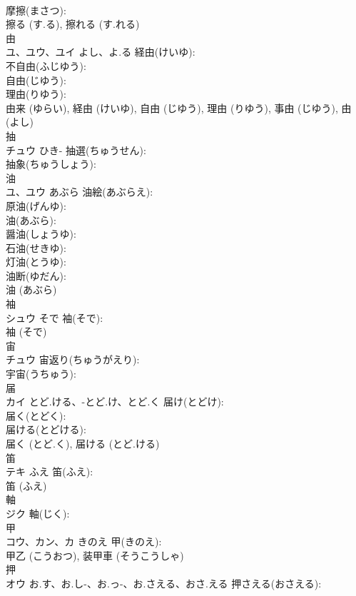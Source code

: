 \documentclass[8pt]{extreport}
\begin{document}
\begin{CJK}{UTF8}{min}
\\	摩擦(まさつ): 
\\	擦る (す.る), 擦れる (す.れる)
\\	由			
\\	ユ、ユウ、ユイ	よし、よ.る	経由(けいゆ): 
\\	不自由(ふじゆう): 
\\	自由(じゆう): 
\\	理由(りゆう): 
\\	由来 (ゆらい), 経由 (けいゆ), 自由 (じゆう), 理由 (りゆう), 事由 (じゆう), 由 (よし)
\\	抽			
\\	チュウ	ひき-	抽選(ちゅうせん): 
\\	抽象(ちゅうしょう): 
\\	油			
\\	ユ、ユウ	あぶら	油絵(あぶらえ): 
\\	原油(げんゆ): 
\\	油(あぶら): 
\\	醤油(しょうゆ): 
\\	石油(せきゆ): 
\\	灯油(とうゆ): 
\\	油断(ゆだん): 
\\	油 (あぶら)
\\	袖			
\\	シュウ	そで	袖(そで): 
\\	袖 (そで)
\\	宙			
\\	チュウ		宙返り(ちゅうがえり): 
\\	宇宙(うちゅう): 
\\	届			
\\	カイ	とど.ける、-とど.け、とど.く	届け(とどけ): 
\\	届く(とどく): 
\\	届ける(とどける): 
\\	届く (とど.く), 届ける (とど.ける)
\\	笛			
\\	テキ	ふえ	笛(ふえ): 
\\	笛 (ふえ)
\\	軸			
\\	ジク		軸(じく): 
\\	甲			
\\	コウ、カン、カ	きのえ	甲(きのえ): 
\\	甲乙 (こうおつ), 装甲車 (そうこうしゃ)
\\	押			
\\	オウ	お.す、お.し-、お.っ-、お.さえる、おさ.える	押さえる(おさえる): 

\end{CJK}
\end{document}
